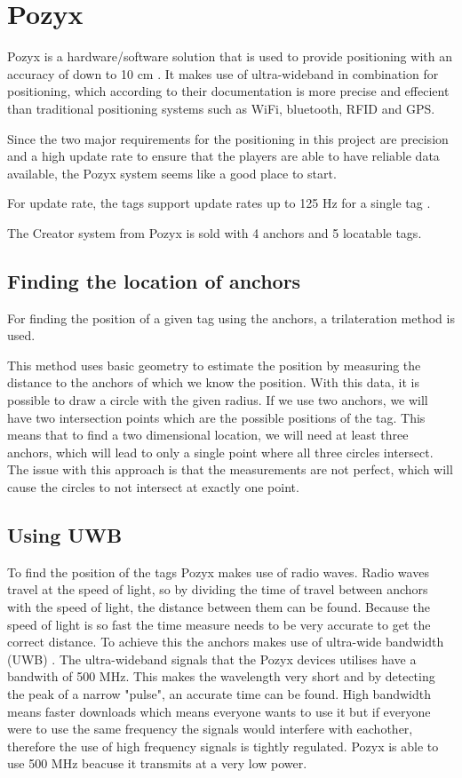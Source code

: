 \section{Pozyx}
Pozyx is a hardware/software solution that is used to provide positioning with an accuracy of down to 10 cm \cite{pozyx}.
It makes use of ultra-wideband in combination for positioning, which according to their documentation is more precise and effecient than traditional positioning systems such as WiFi, bluetooth, RFID and GPS.

Since the two major requirements for the positioning in this project are precision and a high update rate to ensure that the players are able to have reliable data available, the Pozyx system seems like a good place to start.

For update rate, the tags support update rates up to 125 Hz for a single tag \cite{pozyx}.

The Creator system from Pozyx is sold with 4 anchors and 5 locatable tags.
\subsection{Finding the location of anchors}
For finding the position of a given tag using the anchors, a trilateration method is used.

This method uses basic geometry to estimate the position by measuring the distance to the anchors of which we know the position.
With this data, it is possible to draw a circle with the given radius.
If we use two anchors, we will have two intersection points which are the possible positions of the tag.
This means that to find a two dimensional location, we will need at least three anchors, which will lead to only a single point where all three circles intersect.
The issue with this approach is that the measurements are not perfect, which will cause the circles to not intersect at exactly one point.

\subsection{Using UWB}
To find the position of the tags Pozyx makes use of radio waves. 
Radio waves travel at the speed of light, so by dividing the time of travel between anchors with the speed of light, the distance between them can be found.
Because the speed of light is so fast the time measure needs to be very accurate to get the correct distance.
To achieve this the anchors makes use of ultra-wide bandwidth (UWB) \cite{pozyx-UWB}.
The ultra-wideband signals that the Pozyx devices utilises have a bandwith of 500 MHz.
This makes the wavelength very short and by detecting the peak of a narrow "pulse", an accurate time can be found.
High bandwidth means faster downloads which means everyone wants to use it but if everyone were to use the same frequency the signals would interfere with eachother, therefore the use of high frequency signals is tightly regulated.
Pozyx is able to use 500 MHz beacuse it transmits at a very low power.


